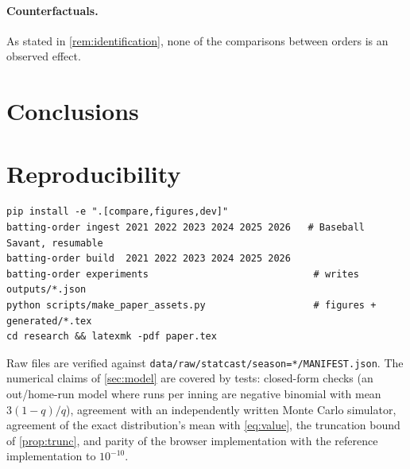 \documentclass[11pt]{article}
\theoremstyle{definition}
\theoremstyle{remark}
\begin{document}
\paragraph{Counterfactuals.} As stated in \cref{rem:identification}, none of the comparisons
between orders is an observed effect.

\section{Conclusions}






\appendix
\section{Reproducibility}\label{app:repro}

\begin{verbatim}
pip install -e ".[compare,figures,dev]"
batting-order ingest 2021 2022 2023 2024 2025 2026   # Baseball Savant, resumable
batting-order build  2021 2022 2023 2024 2025 2026
batting-order experiments                             # writes outputs/*.json
python scripts/make_paper_assets.py                   # figures + generated/*.tex
cd research && latexmk -pdf paper.tex
\end{verbatim}
Raw files are verified against \texttt{data/raw/statcast/season=*/MANIFEST.json}.
The numerical claims of \cref{sec:model} are covered by tests: closed-form checks (an out/home-run
model where runs per inning are negative binomial with mean $3(1-q)/q$), agreement with an
independently written Monte Carlo simulator, agreement of the exact distribution's mean with
\eqref{eq:value}, the truncation bound of \cref{prop:trunc}, and parity of the browser
implementation with the reference implementation to $10^{-10}$.


\end{document}

